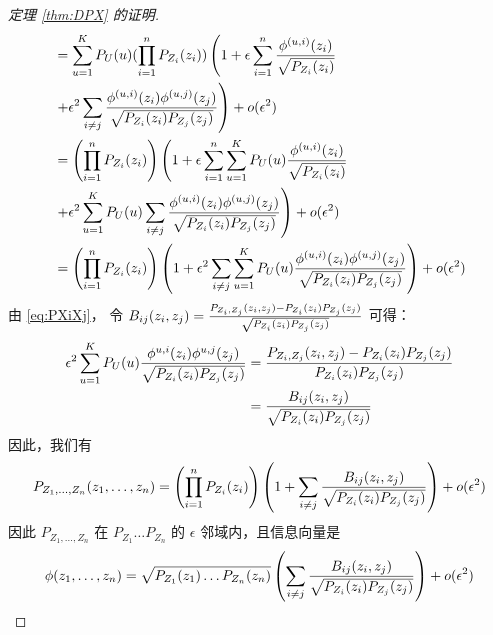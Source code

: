 \begin{proof}[定理 \ref{thm:DPX} 的证明]
\begin{align*}
&=  \sum_{u=1}^{K}P_U(u) (\prod_{i=1}^n  P_{Z_i} (z_i))
\left( 1 + \epsilon\sum_{i=1}^n {\phi^{(u,i)}(z_i) \over \sqrt{P_{Z_i}(z_i)}} \right.\\
&\left. \quad + \epsilon^2\sum_{i\neq j}{\phi^{(u,i)}(z_i)\phi^{(u,j)}(z_j)\over \sqrt{P_{Z_i}(z_i)P_{Z_j}(z_j)} }\right)+o(\epsilon^2) \\
&= \left(\prod_{i=1}^n  P_{Z_i} (z_i) \right)
\left(1+\epsilon\sum_{i=1}^n \sum_{u=1}^{K} P_U(u){\phi^{(u,i)}(z_i) \over \sqrt{P_{Z_i}(z_i)}} \right.\\
&\left. \quad +\epsilon^2 \sum_{u=1}^{K} P_U(u)\sum_{i\neq j}{\phi^{(u,i)}(z_i)\phi^{(u,j)}(z_j)\over \sqrt{P_{Z_i}(z_i)P_{Z_j}(z_j)} } 
\right) + o(\epsilon^2)\\
&= \left(\prod_{i=1}^n  P_{Z_i} (z_i) \right)
\left(1 +\epsilon^2\sum_{i\neq j} \sum_{u=1}^{K}P_U(u){\phi^{(u,i)}(z_i)\phi^{(u,j)}(z_j)\over \sqrt{P_{Z_i}(z_i)P_{Z_j}(z_j)} }\right) + o(\epsilon^2)
\end{align*}
由 \eqref{eq:PXiXj}，
令 $B_{ij}(z_i, z_j)={P_{Z_i, Z_j}(z_i,z_j) - P_{Z_i}(z_i)P_{Z_j}(z_j) \over \sqrt{P_{Z_i}(z_i)P_{Z_j}(z_j)}} $ 可得：
\begin{align}
\epsilon^2\sum_{u=1}^{K}P_U(u)
{\phi^{u,i}(z_i)\phi^{u,j}(z_j)\over \sqrt{P_{Z_i}(z_i)P_{Z_j}(z_j)} } & = {P_{Z_i, Z_j}(z_i, z_j) - P_{Z_i}(z_i)P_{Z_j}(z_j) \over P_{Z_i}(z_i)P_{Z_j}(z_j)} \notag\\
& = {B_{ij}(z_i, z_j) \over \sqrt{P_{Z_i}(z_i)P_{Z_j}(z_j)} } \label{eq:Bsecond}
\end{align}
因此，我们有
\begin{equation}\label{eq:sep}
P_{Z_1,\dots,Z_n}(z_1,\dots,z_n) =  \left(\prod_{i=1}^n  P_{Z_i} (z_i) \right)\left( 1 + \sum_{i\neq j}{B_{ij}(z_i, z_j) \over \sqrt{P_{Z_i}(z_i)P_{Z_j}(z_j)} }\right) +o(\epsilon^2)
\end{equation}
因此 $P_{Z_1,\dots, Z_n}$ 在 $P_{Z_1}\dots P_{Z_n}$ 的
$\epsilon$ 邻域内，且信息向量是
$$\phi(z_1,\dots, z_n)=
\sqrt{P_{Z_1}(z_1)\dots P_{Z_n}(z_n)}
\left(\sum_{i\neq j}{B_{ij}(z_i, z_j) 
\over \sqrt{P_{Z_i}(z_i)P_{Z_j}(z_j)} }\right)
+o(\epsilon^2)$$


\end{proof}
